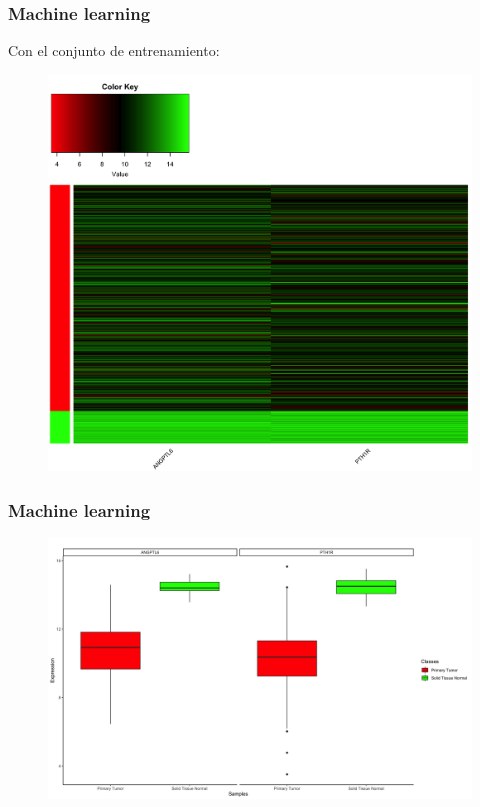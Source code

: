 \documentclass{beamer}
\begin{document}

\begin{frame}\frametitle{Machine learning}
	Con el conjunto de entrenamiento:
	\begin{figure}
		\centering
		\includegraphics[width=.6\textwidth]{images/15_higado_biclase_42_knn_heatmap_mejor_metodo.png}
	\end{figure}
\end{frame}


\begin{frame}\frametitle{Machine learning}
	\begin{figure}
		\centering
		\includegraphics[width=.9\textwidth]{images/16_higado_biclase_43_knn_boxplots_mejor_metodo.png}
	\end{figure}
\end{frame}

\end{document}
